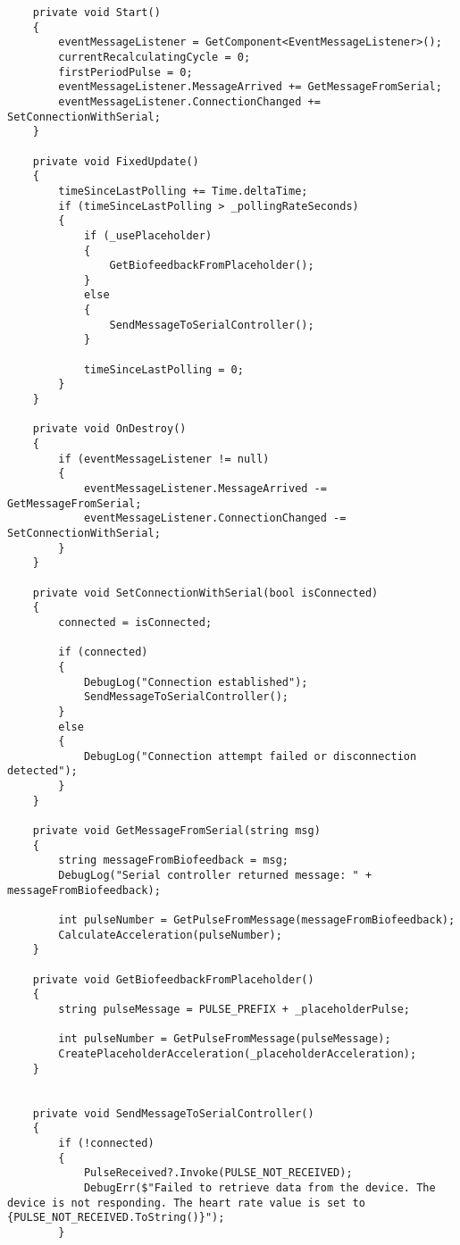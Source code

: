 \begin{verbatim}
    private void Start()
    {
        eventMessageListener = GetComponent<EventMessageListener>();
        currentRecalculatingCycle = 0;
        firstPeriodPulse = 0;
        eventMessageListener.MessageArrived += GetMessageFromSerial;
        eventMessageListener.ConnectionChanged += SetConnectionWithSerial;
    }

    private void FixedUpdate()
    {
        timeSinceLastPolling += Time.deltaTime;
        if (timeSinceLastPolling > _pollingRateSeconds)
        {
            if (_usePlaceholder)
            {
                GetBiofeedbackFromPlaceholder();
            }
            else
            {
                SendMessageToSerialController();
            }

            timeSinceLastPolling = 0;
        }
    }

    private void OnDestroy()
    {
        if (eventMessageListener != null)
        {
            eventMessageListener.MessageArrived -= GetMessageFromSerial;
            eventMessageListener.ConnectionChanged -= SetConnectionWithSerial;
        }
    }

    private void SetConnectionWithSerial(bool isConnected)
    {
        connected = isConnected;

        if (connected)
        {
            DebugLog("Connection established");
            SendMessageToSerialController();
        }
        else
        {
            DebugLog("Connection attempt failed or disconnection detected");
        }
    }

    private void GetMessageFromSerial(string msg)
    {
        string messageFromBiofeedback = msg;
        DebugLog("Serial controller returned message: " + messageFromBiofeedback);

        int pulseNumber = GetPulseFromMessage(messageFromBiofeedback);
        CalculateAcceleration(pulseNumber);
    }

    private void GetBiofeedbackFromPlaceholder()
    {
        string pulseMessage = PULSE_PREFIX + _placeholderPulse;

        int pulseNumber = GetPulseFromMessage(pulseMessage);
        CreatePlaceholderAcceleration(_placeholderAcceleration);
    }


    private void SendMessageToSerialController()
    {
        if (!connected)
        {
            PulseReceived?.Invoke(PULSE_NOT_RECEIVED);
            DebugErr($"Failed to retrieve data from the device. The device is not responding. The heart rate value is set to {PULSE_NOT_RECEIVED.ToString()}");
        }


\end{verbatim}
